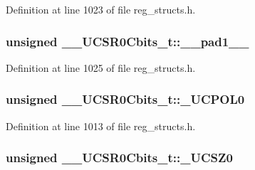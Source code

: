 Definition at line 1023 of file reg\+\_\+structs.\+h.

\hypertarget{union_____u_c_s_r0_cbits__t_a1423aab423deed363e37dd69b2897bf1}{
\subsubsection[{\+\_\+\+\_\+pad1\+\_\+\+\_\+}]{\setlength{\rightskip}{0pt plus 5cm}unsigned \+\_\+\+\_\+\+U\+C\+S\+R0\+Cbits\+\_\+t\+::\+\_\+\+\_\+pad1\+\_\+\+\_\+}}\label{union_____u_c_s_r0_cbits__t_a1423aab423deed363e37dd69b2897bf1}


Definition at line 1025 of file reg\+\_\+structs.\+h.

\hypertarget{union_____u_c_s_r0_cbits__t_a8aacccaef3f2a69b95ccf29150379cd6}{
\subsubsection[{\+\_\+\+U\+C\+P\+O\+L0}]{\setlength{\rightskip}{0pt plus 5cm}unsigned \+\_\+\+\_\+\+U\+C\+S\+R0\+Cbits\+\_\+t\+::\+\_\+\+U\+C\+P\+O\+L0}}\label{union_____u_c_s_r0_cbits__t_a8aacccaef3f2a69b95ccf29150379cd6}


Definition at line 1013 of file reg\+\_\+structs.\+h.

\hypertarget{union_____u_c_s_r0_cbits__t_a2cac9ec01be4edec057aff6974798bf3}{
\subsubsection[{\+\_\+\+U\+C\+S\+Z0}]{\setlength{\rightskip}{0pt plus 5cm}unsigned \+\_\+\+\_\+\+U\+C\+S\+R0\+Cbits\+\_\+t\+::\+\_\+\+U\+C\+S\+Z0}}\label{union_____u_c_s_r0_cbits__t_a2cac9ec01be4edec057aff6974798bf3}


